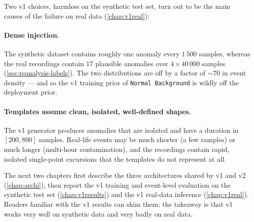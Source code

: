 Two v1 choices, harmless on the synthetic test set, turn out to be the
main causes of the failure on real data
(\cref{chap:v1real}):

\paragraph{Dense injection.} The synthetic dataset contains roughly
one anomaly every $1\,500$ samples, whereas the real recordings contain
$17$ plausible anomalies over $4 \times 40\,000$ samples
(\cref{sec:reanalysis-labels}). The two distributions are off by a
factor of $\sim 70$ in event density --- and so the v1 training prior
of \texttt{Normal Background} is wildly off the deployment prior.

\paragraph{Templates assume clean, isolated, well-defined shapes.} The
v1 generator produces anomalies that are isolated and have a duration
in $[200, 800]$ samples. Real-life events may be much shorter (a few
samples) or much longer (multi-hour contamination), and the recordings
contain rapid, isolated single-point excursions that the templates do
not represent at all.

The next two chapters first describe the three architectures shared by
v1 and v2 (\cref{chap:archi}), then report the v1 training and
event-level evaluation on the synthetic test set (\cref{chap:v1results})
and the v1 real-data inference (\cref{chap:v1real}). Readers
familiar with the v1 results can skim them; the takeaway is that v1
works very well on synthetic data and very badly on real data.
